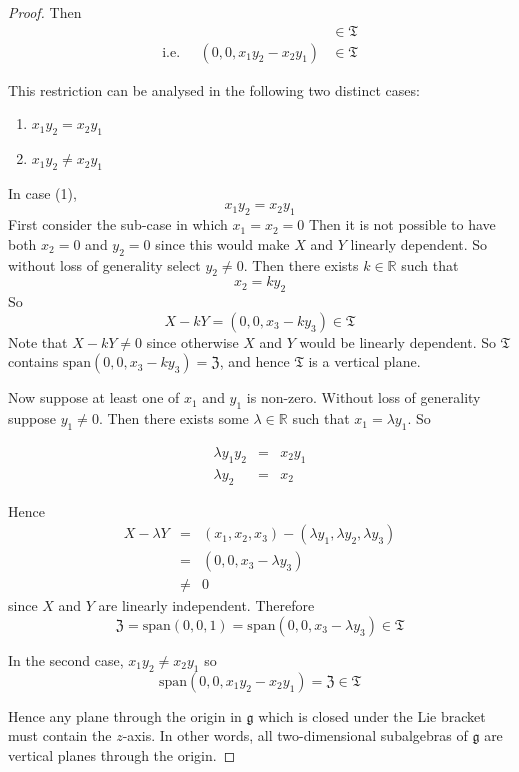 \documentclass[honours]{UNSWthesis}
\newcommand{\R}{\mathbb{R}}
\newcommand{\g}{\mathfrak{g}}
\newcommand{\1}{\mathbf{e}_{1}}
\newcommand{\2}{\mathbf{e}_{3}}
\newcommand{\3}{\mathbf{e}_{3}}
\begin{document}
\begin{proof}
Then  
\begin{eqnarray*}
  [X,Y] & \in \mathfrak{T} \\
\text{i.e.}\;\;\;\;\;(0,0, x_{1}y_{2}-x_{2}y_{1}) & \in \mathfrak{T}
\end{eqnarray*}
   
This restriction can be analysed in the following two distinct cases:

\begin{enumerate}
 \item $x_{1}y_{2}=x_{2}y_{1}$
 \item $x_{1}y_{2}\neq x_{2}y_{1}$
\end{enumerate}

In case (1), 
\[
x_{1}y_{2}=x_{2}y_{1}
\]
First consider the sub-case in which $x_{1}=x_{2}=0$ Then it is not possible to have both $x_{2}=0$ and $y_{2}=0$ since this would make $X$ and $Y$ linearly dependent. So without loss of generality select $y_{2} \neq 0$. Then there exists $k \in \R$ such that 
\[
x_{2} = ky_{2}
\]
So 
\[
X-kY=(0,0,x_{3}-ky_{3}) \in \mathfrak{T}
\]
Note that $X-kY \neq 0$ since otherwise $X$ and $Y$ would be linearly dependent. So $\mathfrak{T}$ contains $\text{span}(0,0,x_{3}-ky_{3})=\mathfrak{Z}$, and hence $\mathfrak{T}$ is a vertical plane. 

Now suppose at least one of $x_{1}$ and $y_{1}$ is non-zero. Without loss of generality suppose $y_{1} \neq 0$.
Then there exists some $\lambda \in \R$ such that $x_{1} = \lambda y_{1}$. So

\begin{eqnarray*}
 \lambda y_{1}y_{2} &=& x_{2} y_{1}\\
 \lambda y_{2} &=& x_{2}
\end{eqnarray*}

Hence
\begin{eqnarray*}
 X-\lambda Y & = & (x_{1},x_{2},x_{3})-(\lambda y_{1},\lambda y_{2},\lambda y_{3}) \\
	     & = & (0,0,x_{3}-\lambda y_{3}) \\
	     & \neq & 0
\end{eqnarray*}
since $X$ and $Y$ are linearly independent. 
Therefore 
\[
\mathfrak{Z}=\text{span}(0,0,1)=\text{span}(0,0,x_{3}-\lambda y_{3}) \in \mathfrak{T}
\]

In the second case, $x_{1}y_{2}\neq x_{2}y_{1}$ so 
\[
\text{span}(0,0, x_{1}y_{2}- x_{2}y_{1})= \mathfrak{Z} \in \mathfrak{T}
\]

Hence any plane through the origin in $\g$ which is closed under the Lie bracket must contain the $z$-axis. In other words, all two-dimensional subalgebras of $\g$ are vertical planes through the origin.



\end{proof}
\end{document}
